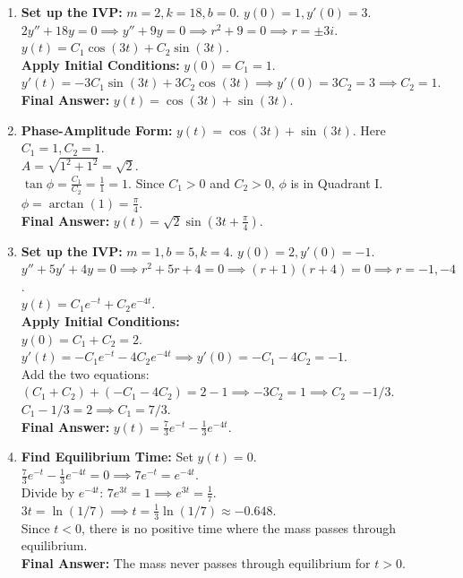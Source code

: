 \documentclass[11pt]{article}
\begin{document}
\begin{enumerate}[label=\textbf{\arabic*.}]
    \item \textbf{Set up the IVP:} $m=2, k=18, b=0$. $y(0) = 1, y'(0) = 3$. \\
    $2y'' + 18y = 0 \implies y'' + 9y = 0 \implies r^2 + 9 = 0 \implies r = \pm 3i$. \\
    $y(t) = C_1 \cos(3t) + C_2 \sin(3t)$. \\
    \textbf{Apply Initial Conditions:} $y(0) = C_1 = 1$. \\
    $y'(t) = -3C_1 \sin(3t) + 3C_2 \cos(3t) \implies y'(0) = 3C_2 = 3 \implies C_2 = 1$. \\
    \textbf{Final Answer:} $y(t) = \cos(3t) + \sin(3t)$.

    \item \textbf{Phase-Amplitude Form:} $y(t) = \cos(3t) + \sin(3t)$. Here $C_1 = 1, C_2 = 1$. \\
    $A = \sqrt{1^2 + 1^2} = \sqrt{2}$. \\
    $\tan \phi = \frac{C_1}{C_2} = \frac{1}{1} = 1$. Since $C_1 > 0$ and $C_2 > 0$, $\phi$ is in Quadrant I. \\
    $\phi = \arctan(1) = \frac{\pi}{4}$. \\
    \textbf{Final Answer:} $y(t) = \sqrt{2}\sin\left(3t + \frac{\pi}{4}\right)$.

    \item \textbf{Set up the IVP:} $m=1, b=5, k=4$. $y(0) = 2, y'(0) = -1$. \\
    $y'' + 5y' + 4y = 0 \implies r^2 + 5r + 4 = 0 \implies (r+1)(r+4) = 0 \implies r = -1, -4$. \\
    $y(t) = C_1 e^{-t} + C_2 e^{-4t}$. \\
    \textbf{Apply Initial Conditions:} \\
    $y(0) = C_1 + C_2 = 2$. \\
    $y'(t) = -C_1 e^{-t} - 4C_2 e^{-4t} \implies y'(0) = -C_1 - 4C_2 = -1$. \\
    Add the two equations: $(C_1 + C_2) + (-C_1 - 4C_2) = 2 - 1 \implies -3C_2 = 1 \implies C_2 = -1/3$. \\
    $C_1 - 1/3 = 2 \implies C_1 = 7/3$. \\
    \textbf{Final Answer:} $y(t) = \frac{7}{3}e^{-t} - \frac{1}{3}e^{-4t}$.

    \item \textbf{Find Equilibrium Time:} Set $y(t) = 0$. \\
    $\frac{7}{3}e^{-t} - \frac{1}{3}e^{-4t} = 0 \implies 7e^{-t} = e^{-4t}$. \\
    Divide by $e^{-4t}$: $7e^{3t} = 1 \implies e^{3t} = \frac{1}{7}$. \\
    $3t = \ln(1/7) \implies t = \frac{1}{3}\ln(1/7) \approx -0.648$. \\
    Since $t < 0$, there is no positive time where the mass passes through equilibrium. \\
    \textbf{Final Answer:} The mass never passes through equilibrium for $t > 0$.


\end{enumerate}
\end{document}
